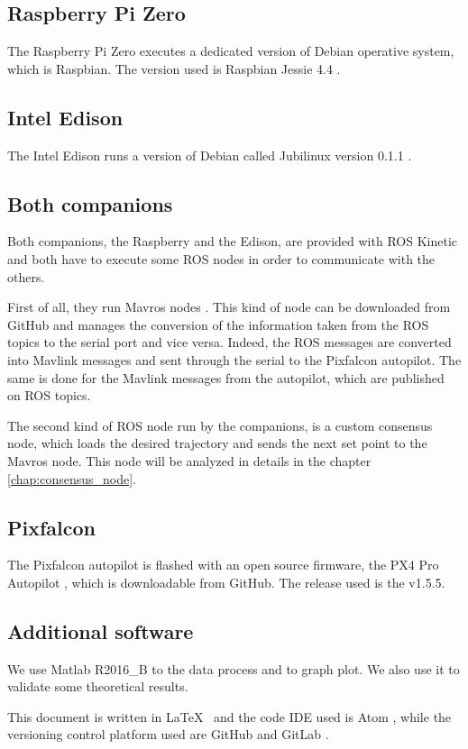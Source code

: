 \subsection{Raspberry Pi Zero}
The Raspberry Pi Zero executes a dedicated version of Debian operative system,
which is Raspbian. The version used is Raspbian Jessie 4.4 \cite{raspbian}.

\subsection{Intel Edison}
The Intel Edison runs a version of Debian called Jubilinux version 0.1.1 \cite{jubilinux}.

\subsection{Both companions}
Both companions, the Raspberry and the Edison, are provided with ROS Kinetic and
both have to execute some ROS nodes in order to communicate with the others.

First of all, they run Mavros nodes \cite{mavros}.
This kind of node can be downloaded from GitHub and manages the conversion of the
information taken from the ROS topics to the serial port and vice versa. Indeed,
the ROS messages are converted into Mavlink messages and sent through the serial
to the Pixfalcon autopilot. The same is done for the Mavlink messages from the
autopilot, which are published on ROS topics.

The second kind of ROS node run by the companions, is a custom consensus node, which
loads the desired trajectory and sends the next set point to the Mavros node.
This node will be analyzed in details in the chapter \ref{chap:consensus_node}.

\subsection{Pixfalcon}
The Pixfalcon autopilot is flashed with an open source firmware,
the PX4 Pro Autopilot \cite{px4}, which is downloadable from GitHub.
The release used is the v1.5.5.

\subsection{Additional software}
We use Matlab R2016\_B \cite{matlab} to the data process and to graph plot. We also use it to validate
some theoretical results.

This document is written in  \LaTeX \ \cite{latex} and the code IDE used is Atom \cite{atom},
while the versioning control platform used are GitHub \cite{github} and GitLab \cite{gitlab}.
